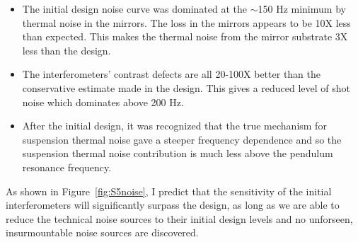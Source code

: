 \begin{itemize}
\item The initial design noise curve was dominated at the $\sim$150 Hz minimum
      by thermal noise in the mirrors. The loss in the mirrors appears to be 
      10X less than expected. This makes the thermal noise from the mirror 
      substrate 3X less than the design.

\item The interferometers' contrast defects are all 20-100X better than the
      conservative estimate made in the design. This gives a reduced level of
      shot noise which dominates above 200 Hz.

\item After the initial design, it was recognized that the true mechanism for
      suspension thermal noise gave a steeper frequency dependence and so the
      suspension thermal noise contribution is much less above the pendulum
      resonance frequency.
\end{itemize}

As shown in Figure~\ref{fig:S5noise}, I predict that the sensitivity of the initial
interferometers will significantly surpass the design, as long as we are able to
reduce the technical noise sources to their initial design levels and no
unforseen, insurmountable noise sources are discovered.

